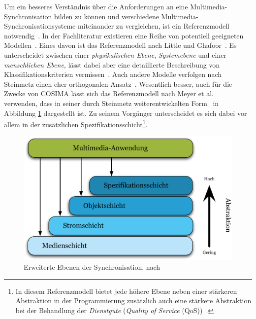   Um ein besseres Verständnis über die Anforderungen an eine Multimedia-Synchronisation bilden zu können und verschiedene Multimedia-Synchronisationsysteme miteinander zu vergleichen, ist ein Referenzmodell notwendig~\citep[S. 601]{multimedia_technologie}. In der Fachliteratur existieren eine Reihe von potentiell geeigneten Modellen~\citep[S. 601]{multimedia_technologie}. Eines davon ist das Referenzmodell nach Little und Ghafoor~\citep{little1991ms}. Es unterscheidet zwischen einer \emph{physikalischen Ebene}, \emph{Systemebene} und einer \emph{menschlichen Ebene}, lässt dabei aber eine detaillierte Beschreibung von Klassifikationskriterien vermissen~\citep[S. 601]{multimedia_technologie}. Auch andere Modelle verfolgen nach Steinmetz einen eher orthogonalen Ansatz~\citep[S. 601]{multimedia_technologie}. Wesentlich besser, auch für die Zwecke von COSIMA lässt sich das Referenzmodell nach Meyer et al.~\citep{meyer1993tms} verwenden, dass in seiner durch Steinmetz weiterentwickelten Form~\citep{steinmetz1995mcc} in Abbildung \ref{fig:images_Erweiterte_Synchronisations-Ebenen} dargestellt ist. Zu seinem Vorgänger unterscheidet es sich dabei vor allem in der zusätzlichen Spezifikationsschicht\footnote{In diesem Referenzmodell bietet jede höhere Ebene neben einer stärkeren Abstraktion in der Programmierung zusätzlich auch eine stärkere Abstraktion bei der Behandlung der \emph{Dienstgüte} (\emph{Quality of Service} (QoS))~\citep[S. 601]{steinmetz1995mcc}.}.

  \begin{figure}[!ht]
    \centering
      \includegraphics[width=.9\textwidth]{images/Erweiterte_Synchronisations-Ebenen.pdf}
    \caption{Erweiterte Ebenen der Synchronisation, nach~\citep[S. 601]{steinmetz1995mcc}}
    \label{fig:images_Erweiterte_Synchronisations-Ebenen}
  \end{figure}
  
